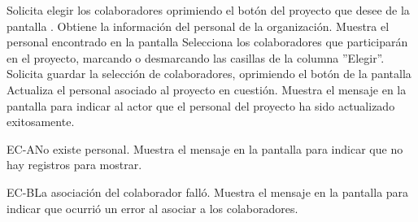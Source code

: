 	\begin{UCtrayectoria}
		\UCpaso[\UCactor] Solicita elegir los colaboradores oprimiendo el botón  del proyecto que desee de la pantalla .
		\UCpaso[\UCsist] Obtiene la información del personal de la organización. 
		\UCpaso[\UCsist] Muestra el personal encontrado en la pantalla 
		\UCpaso[\UCactor] Selecciona los colaboradores que participarán en el proyecto, marcando o desmarcando las casillas de la columna ''Elegir''.
		\UCpaso[\UCactor] Solicita guardar la selección de colaboradores, oprimiendo el botón  de la pantalla 
		\UCpaso[\UCsist] Actualiza el personal asociado al proyecto en cuestión. 
		\UCpaso[\UCsist] Muestra el mensaje  en la pantalla  para indicar al actor que el personal del proyecto ha sido actualizado exitosamente.
	\end{UCtrayectoria}		
		\begin{UCtrayectoriaA}{EC-A}{No existe personal.}
			\UCpaso[\UCsist] Muestra el mensaje  en la pantalla  para indicar que no hay registros para mostrar.
		\end{UCtrayectoriaA}

	\begin{UCtrayectoriaA}{EC-B}{La asociación del colaborador falló.}
		\UCpaso[\UCsist] Muestra el mensaje  en la pantalla  para indicar que ocurrió un error al asociar a los colaboradores.
	\end{UCtrayectoriaA}
	
